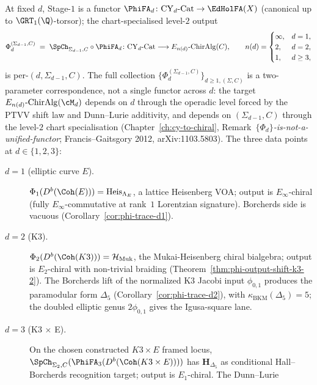 \begin{remark}
\label{rem:phiutp-d-dependent-output}
At fixed $d$, Stage-$1$ is a functor
$\PhiFA_d\colon \mathrm{CY}_d\text{-}\mathrm{Cat} \to \EdHolFA(X)$
(canonical up to $\GRT_1(\Q)$-torsor); the chart-specialised level-$2$
output
\[
 \Phi^{(\Sigma_{d-1}, C)}_d
 \;=\; \SpCh_{\Sigma_{d-1}, C} \circ \PhiFA_d
 \colon \mathrm{CY}_d\text{-}\mathrm{Cat} \longrightarrow E_{n(d)}\text{-}\mathrm{ChirAlg}(C),
 \qquad
 n(d) = \begin{cases} \infty, & d = 1, \\ 2, & d = 2, \\ 1, & d \ge 3, \end{cases}
\]
is per-$(d, \Sigma_{d-1}, C)$. The full collection
$\{\Phi^{(\Sigma_{d-1}, C)}_d\}_{d \geq 1, (\Sigma, C)}$ is a
two-parameter correspondence, not a single functor across
$d$: the target $E_{n(d)}\text{-}\mathrm{ChirAlg}(\cM_d)$ depends on $d$
through the operadic level forced by the PTVV shift law and Dunn--Lurie
additivity, and depends on $(\Sigma_{d-1}, C)$ through the level-$2$
chart specialisation (Chapter~\ref{ch:cy-to-chiral},
Remark~\textit{$\{\Phi_d\}$-is-not-a-unified-functor}; Francis--Gaitsgory 2012, arXiv:1103.5803). The three data points at $d \in \{1, 2, 3\}$:
\begin{description}
 \item[$d = 1$ (elliptic curve $E$).] $\Phi_1(D^b(\Coh(E))) = \mathrm{Heis}_{\Lambda_E}$, a lattice Heisenberg VOA; output is $E_\infty$-chiral (fully $E_\infty$-commutative at rank~$1$ Lorentzian signature). Borcherds side is vacuous (Corollary~\ref{cor:phi-trace-d1}).
 \item[$d = 2$ (K3).] $\Phi_2(D^b(\Coh(K3))) = \mathcal{H}_{\mathrm{Muk}}$, the Mukai-Heisenberg chiral bialgebra; output is $E_2$-chiral with non-trivial braiding (Theorem~\ref{thm:phi-output-shift-k3-2}). The Borcherds lift of the normalized K3 Jacobi input $\phi_{0,1}$ produces the paramodular form $\Delta_5$ (Corollary~\ref{cor:phi-trace-d2}), with $\kappa_{\mathrm{BKM}}(\Delta_5) = 5$; the doubled elliptic genus \(2\phi_{0,1}\) gives the Igusa-square lane.
 \item[$d = 3$ (K3 $\times$ E).] On the chosen constructed $K3\times E$ framed locus,
 $\SpCh_{\Sigma_2,C}(\PhiFA_3(D^b(\Coh(K3 \times E))))$ has
 $\mathbf{H}_{\Delta_5}$ as conditional Hall--Borcherds recognition
target; output is $E_1$-chiral. The Dunn--Lurie

\end{description}
\end{remark}
